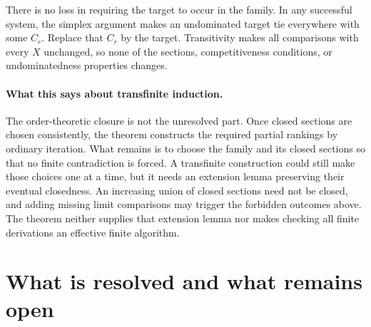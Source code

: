 \documentclass[11pt]{article}
\theoremstyle{remark}\newtheorem{remark}[theorem]{Remark}
\begin{document}
There is no loss in requiring the target to occur in the family.
In any successful system, the simplex argument makes an undominated target
tie everywhere with some $C_r$. Replace that $C_r$ by the target.
Transitivity makes all comparisons with every $X$ unchanged, so none of
the sections, competitiveness conditions, or undominatedness properties
changes.

\paragraph{What this says about transfinite induction.}
The order-theoretic closure is not the unresolved part. Once closed
sections are chosen consistently, the theorem constructs the required
partial rankings by ordinary iteration. What remains is to choose the
family and its closed sections so that no finite contradiction is forced.
A transfinite construction could still make those choices one at a time,
but it needs an extension lemma preserving their eventual closedness.
An increasing union of closed sections need not be closed, and adding
missing limit comparisons may trigger the forbidden outcomes above.
The theorem neither supplies that extension lemma nor makes checking all
finite derivations an effective finite algorithm.

\section{What is resolved and what remains open}
\end{document}
